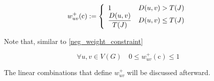 \begin{equation}
    w_{uv}^+(\mathrm c) := \soe{ll}{1 & D(u, v) > T(J) \\ \dfrac{D(u, v)}{T(J)} & D(u, v) \le T(J)}
\end{equation}

Note that, similar to \cref{neg_weight_constraint}

\begin{equation}
    \forall u, v \in V(G) \quad 0 \le w_{uv}^+(\mathrm c) \le 1
\end{equation}

The linear combinations that define $w_{uv}^+$ will be discussed afterward.

\cleardoublepage
